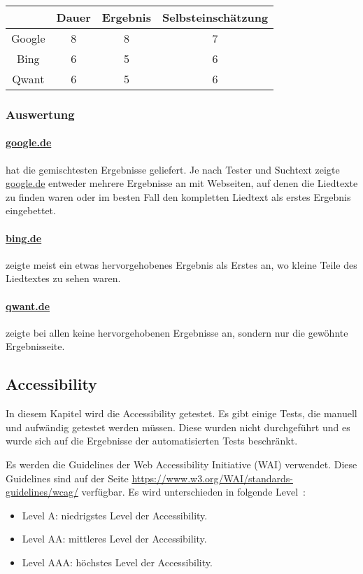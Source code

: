 \begin{tabular}{|c|c|c|c|}
    \hline
    & Dauer & Ergebnis & Selbsteinschätzung \\
    \hline
    Google & 8     & 8       & 7                  \\
    \hline
    Bing   & 6     & 5        & 6                  \\
    \hline
    Qwant  & 6     & 5        & 6                  \\
    \hline
\end{tabular}

\subsubsection*{Auswertung}
\paragraph{\url{google.de}} hat die gemischtesten Ergebnisse geliefert.
Je nach Tester und Suchtext zeigte \url{google.de} entweder mehrere Ergebnisse an mit Webseiten,
auf denen die Liedtexte zu finden waren oder im besten Fall den kompletten Liedtext als erstes Ergebnis eingebettet.
\paragraph{\url{bing.de}} zeigte meist ein etwas hervorgehobenes Ergebnis als Erstes an, wo kleine Teile des Liedtextes zu sehen waren.
\paragraph{\url{qwant.de}} zeigte bei allen keine hervorgehobenen Ergebnisse an, sondern nur die gewöhnte Ergebnisseite.

\subsection{Accessibility}\label{subsec:accessibility2}
In diesem Kapitel wird die Accessibility getestet.
Es gibt einige Tests, die manuell und aufwändig getestet werden müssen.
Diese wurden nicht durchgeführt und es wurde sich auf die Ergebnisse der automatisierten Tests beschränkt.

Es werden die Guidelines der Web Accessibility Initiative (WAI) verwendet.
Diese Guidelines sind auf der Seite \url{https://www.w3.org/WAI/standards-guidelines/wcag/} verfügbar.\newline
Es wird unterschieden in folgende Level~\autocite{WCAG21}:
\begin{itemize}
    \item Level A: niedrigstes Level der Accessibility.
    \item Level AA: mittleres Level der Accessibility.
    \item Level AAA: höchstes Level der Accessibility.
\end{itemize}


